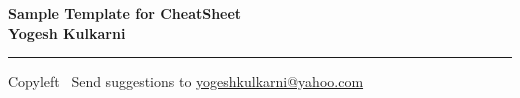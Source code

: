 
\graphicspath{{images/}}

\footnotesize


\begin{center}
\Large{\textbf{Sample Template for CheatSheet\\ Yogesh Kulkarni}}  
\end{center}

\begin{multicols}{2}


\end{multicols}

\rule{\linewidth}{0.25pt}
\scriptsize
Copyleft \textcopyleft\  Send suggestions to 
\href{http://www.yogeshkulkarni.com}{yogeshkulkarni@yahoo.com}


